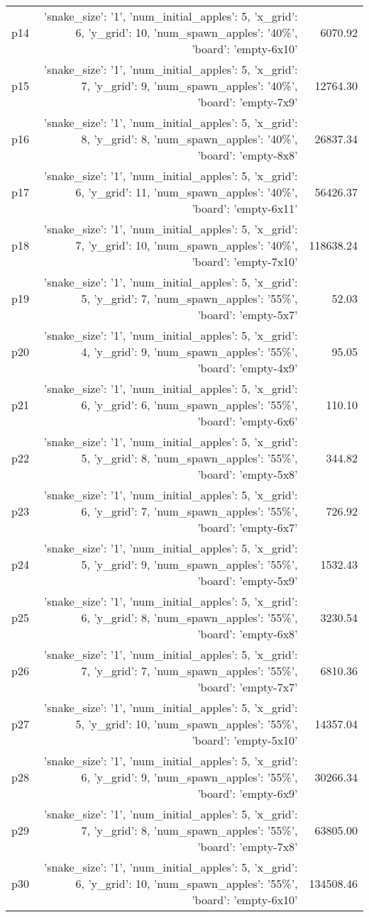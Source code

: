 \documentclass{article}
\begin{document}
\begin{center}
\begin{tabular}{@{}l|r|r@{}}
  p14&{'snake\_size': '1', 'num\_initial\_apples': 5, 'x\_grid': 6, 'y\_grid': 10, 'num\_spawn\_apples': '40\%', 'board': 'empty-6x10'}&6070.92\\
  p15&{'snake\_size': '1', 'num\_initial\_apples': 5, 'x\_grid': 7, 'y\_grid': 9, 'num\_spawn\_apples': '40\%', 'board': 'empty-7x9'}&12764.30\\
  p16&{'snake\_size': '1', 'num\_initial\_apples': 5, 'x\_grid': 8, 'y\_grid': 8, 'num\_spawn\_apples': '40\%', 'board': 'empty-8x8'}&26837.34\\
  p17&{'snake\_size': '1', 'num\_initial\_apples': 5, 'x\_grid': 6, 'y\_grid': 11, 'num\_spawn\_apples': '40\%', 'board': 'empty-6x11'}&56426.37\\
  p18&{'snake\_size': '1', 'num\_initial\_apples': 5, 'x\_grid': 7, 'y\_grid': 10, 'num\_spawn\_apples': '40\%', 'board': 'empty-7x10'}&118638.24\\
  p19&{'snake\_size': '1', 'num\_initial\_apples': 5, 'x\_grid': 5, 'y\_grid': 7, 'num\_spawn\_apples': '55\%', 'board': 'empty-5x7'}&52.03\\
  p20&{'snake\_size': '1', 'num\_initial\_apples': 5, 'x\_grid': 4, 'y\_grid': 9, 'num\_spawn\_apples': '55\%', 'board': 'empty-4x9'}&95.05\\
  p21&{'snake\_size': '1', 'num\_initial\_apples': 5, 'x\_grid': 6, 'y\_grid': 6, 'num\_spawn\_apples': '55\%', 'board': 'empty-6x6'}&110.10\\
  p22&{'snake\_size': '1', 'num\_initial\_apples': 5, 'x\_grid': 5, 'y\_grid': 8, 'num\_spawn\_apples': '55\%', 'board': 'empty-5x8'}&344.82\\
  p23&{'snake\_size': '1', 'num\_initial\_apples': 5, 'x\_grid': 6, 'y\_grid': 7, 'num\_spawn\_apples': '55\%', 'board': 'empty-6x7'}&726.92\\
  p24&{'snake\_size': '1', 'num\_initial\_apples': 5, 'x\_grid': 5, 'y\_grid': 9, 'num\_spawn\_apples': '55\%', 'board': 'empty-5x9'}&1532.43\\
  p25&{'snake\_size': '1', 'num\_initial\_apples': 5, 'x\_grid': 6, 'y\_grid': 8, 'num\_spawn\_apples': '55\%', 'board': 'empty-6x8'}&3230.54\\
  p26&{'snake\_size': '1', 'num\_initial\_apples': 5, 'x\_grid': 7, 'y\_grid': 7, 'num\_spawn\_apples': '55\%', 'board': 'empty-7x7'}&6810.36\\
  p27&{'snake\_size': '1', 'num\_initial\_apples': 5, 'x\_grid': 5, 'y\_grid': 10, 'num\_spawn\_apples': '55\%', 'board': 'empty-5x10'}&14357.04\\
  p28&{'snake\_size': '1', 'num\_initial\_apples': 5, 'x\_grid': 6, 'y\_grid': 9, 'num\_spawn\_apples': '55\%', 'board': 'empty-6x9'}&30266.34\\
  p29&{'snake\_size': '1', 'num\_initial\_apples': 5, 'x\_grid': 7, 'y\_grid': 8, 'num\_spawn\_apples': '55\%', 'board': 'empty-7x8'}&63805.00\\
  p30&{'snake\_size': '1', 'num\_initial\_apples': 5, 'x\_grid': 6, 'y\_grid': 10, 'num\_spawn\_apples': '55\%', 'board': 'empty-6x10'}&134508.46
                            \end{tabular}
                            \end{center}
                    
\end{document}
